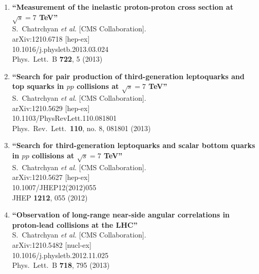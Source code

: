 \documentclass{article}
\begin{document}
\begin{enumerate}
\item%
{\bf ``Measurement of the inelastic proton-proton cross section at $\sqrt{s}=7$ TeV''}
  \\{}S.~Chatrchyan {\it et al.}  [CMS Collaboration].
  \\{}arXiv:1210.6718 [hep-ex]
    \\{}10.1016/j.physletb.2013.03.024
\\{}Phys.\ Lett.\ B {\bf 722}, 5 (2013) %


\item%
{\bf ``Search for pair production of third-generation leptoquarks and top squarks in $pp$ collisions at $\sqrt{s}=7$ TeV''}
  \\{}S.~Chatrchyan {\it et al.}  [CMS Collaboration].
  \\{}arXiv:1210.5629 [hep-ex]
    \\{}10.1103/PhysRevLett.110.081801
\\{}Phys.\ Rev.\ Lett.\  {\bf 110}, no. 8, 081801 (2013) %


\item%
{\bf ``Search for third-generation leptoquarks and scalar bottom quarks in $pp$ collisions at $\sqrt{s}=7$ TeV''}
  \\{}S.~Chatrchyan {\it et al.}  [CMS Collaboration].
  \\{}arXiv:1210.5627 [hep-ex]
    \\{}10.1007/JHEP12(2012)055
\\{}JHEP {\bf 1212}, 055 (2012) %


\item%
{\bf ``Observation of long-range near-side angular correlations in proton-lead collisions at the LHC''}
  \\{}S.~Chatrchyan {\it et al.}  [CMS Collaboration].
  \\{}arXiv:1210.5482 [nucl-ex]
    \\{}10.1016/j.physletb.2012.11.025
\\{}Phys.\ Lett.\ B {\bf 718}, 795 (2013) %



\end{enumerate}
\end{document}
